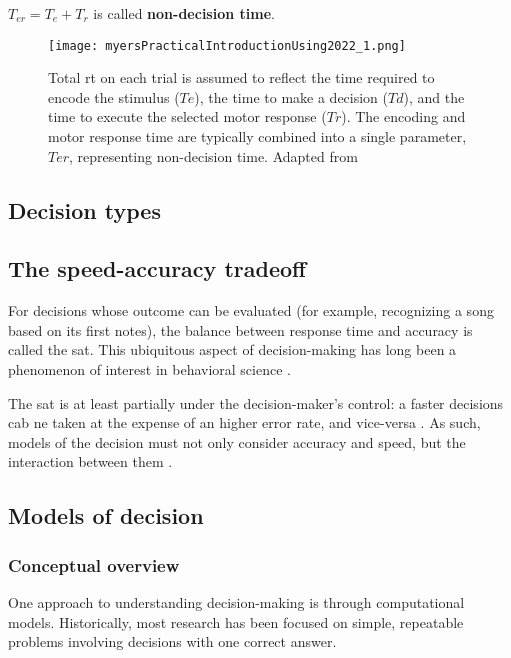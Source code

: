 $T_{er}= T_e+T_r$ is called \textbf{non-decision time}.

\begin{figure}[ht]
    \centering
    \texttt{[image: myersPracticalIntroductionUsing2022\_1.png]}
    \caption[Schematc of a decision]{Total \acrshort{rt} on each trial is assumed to reflect the time required to encode the stimulus ($Te$), the time to make a decision ($Td$), and the time to execute the selected motor response ($Tr$). The encoding and motor response time are typically combined into a single parameter, $Ter$, representing non-decision time. Adapted from \cite{myersPracticalIntroductionUsing2022}}
\end{figure}

\subsection{Decision types}


\subsection{The speed-accuracy tradeoff}

For decisions whose outcome can be evaluated (for example, recognizing a song based on its first notes), the balance between response time and accuracy is called the \acrfull{sat}. This ubiquitous aspect of decision-making has long been a phenomenon of interest in behavioral science \cite{heitzSpeedaccuracyTradeoffHistory2014}.

The \acrshort{sat} is at least partially under the decision-maker's control: a faster decisions cab ne taken at the expense of an higher error rate, and vice-versa \cite{ratcliffDiffusionDecisionModel2016}. As such, models of the decision must not only consider accuracy and speed, but the interaction between them \cite{myersPracticalIntroductionUsing2022}.

\subsection{Models of decision}

\subsubsection{Conceptual overview}

One approach to understanding decision-making is through computational models. Historically, most research has been focused on simple, repeatable problems involving decisions with one correct answer.

